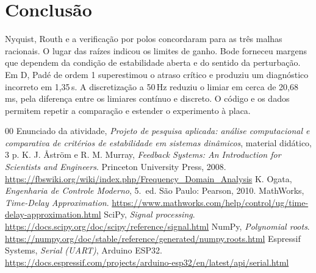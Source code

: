 \documentclass[conference]{IEEEtran}
\begin{document}
\section{Conclusão}
Nyquist, Routh e a verificação por polos concordaram para as três malhas racionais. O lugar das raízes indicou os limites de ganho. Bode forneceu margens que dependem da condição de estabilidade aberta e do sentido da perturbação. Em D, Padé de ordem 1 superestimou o atraso crítico e produziu um diagnóstico incorreto em 1,35\,s. A discretização a 50\,Hz reduziu o limiar em cerca de 20,68\,ms, pela diferença entre os limiares contínuo e discreto. O código e os dados permitem repetir a comparação e estender o experimento à placa.

\begin{thebibliography}{00}
 Enunciado da atividade, \emph{Projeto de pesquisa aplicada: análise computacional e comparativa de critérios de estabilidade em sistemas dinâmicos}, material didático, 3 p.
 K. J. Åström e R. M. Murray, \emph{Feedback Systems: An Introduction for Scientists and Engineers}. Princeton University Press, 2008. \url{https://fbswiki.org/wiki/index.php/Frequency_Domain_Analysis}
 K. Ogata, \emph{Engenharia de Controle Moderno}, 5.\ ed. São Paulo: Pearson, 2010.
 MathWorks, \emph{Time-Delay Approximation}. \url{https://www.mathworks.com/help/control/ug/time-delay-approximation.html}
 SciPy, \emph{Signal processing}. \url{https://docs.scipy.org/doc/scipy/reference/signal.html}
 NumPy, \emph{Polynomial roots}. \url{https://numpy.org/doc/stable/reference/generated/numpy.roots.html}
 Espressif Systems, \emph{Serial (UART)}, Arduino ESP32. \url{https://docs.espressif.com/projects/arduino-esp32/en/latest/api/serial.html}
\end{thebibliography}
\end{document}
